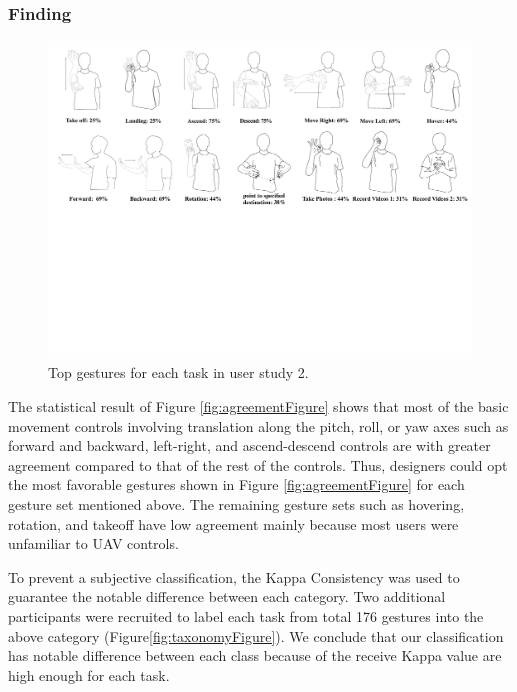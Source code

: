 \documentclass{sigchi}
\begin{document}
\subsubsection{Finding}
\begin{figure}
  \centering
  \includegraphics[width=1\textwidth]{GestureSetFigure1.pdf}
  \caption{Top gestures for each task in user study 2.}
  \label{fig:GestureSetFigure}
  \end{figure}
The statistical result of Figure \ref{fig:agreementFigure} shows that most of the basic movement controls involving translation along the pitch, roll, or yaw axes such as forward and backward, left-right, and ascend-descend controls are with greater agreement compared to that of the rest of the controls. Thus, designers could opt the most favorable gestures shown in Figure \ref{fig:agreementFigure} for each gesture set mentioned above. The remaining gesture sets such as hovering, rotation, and takeoff have low agreement mainly because most users were unfamiliar to UAV controls.

To prevent a subjective classification, the Kappa Consistency was used to guarantee the notable difference between each category. Two additional participants were recruited to label each task from total 176 gestures into the above category (Figure\ref{fig:taxonomyFigure}). We conclude that our classification has notable difference between each class because of the receive Kappa value are high enough for each task.



\end{document}
